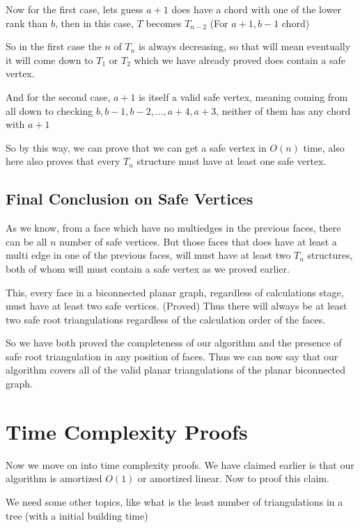 \documentclass[12pt,a4paper]{article}
\begin{document}
Now for the first case, lets guess $a+1$ does have a chord with one of the lower rank than $b$, then in this case, $T$ becomes $T_{n-2}$ (For $a+1, b-1$ chord)

So in the first case the $n$ of $T_n$ is always decreasing, so that will mean eventually it will come down to $T_1$ or $T_2$ which we have already proved does contain a safe vertex. 

And for the second case, $a+1$ is itself a valid safe vertex, meaning coming from all down to checking $b, b-1,b-2,\ldots,a+4,a+3$, neither of them has any chord with $a+1$

So by this way, we can prove that we can get a safe vertex in $O(n)$ time, also here also proves that every $T_n$ structure must have at least one safe vertex.

\subsection{Final Conclusion on Safe Vertices}

As we know, from a face which have no multiedges in the previous faces, there can be all $n$ number of safe vertices. But those faces that does have at least a multi edge in one of the previous faces, will must have at least two $T_n$ structures, both of whom will must contain a safe vertex as we proved earlier.

This, every face in a biconnected planar graph, regardless of calculations stage, must have at least two safe vertices. (Proved) Thus there will always be at least two safe root triangulations regardless of the calculation order of the faces.

So we have both proved the completeness of our algorithm and the presence of safe root triangulation in any position of faces. Thus we can now say that our algorithm covers all of the valid planar triangulations of the planar biconnected graph.

\section{Time Complexity Proofs}

Now we move on into time complexity proofs. We have claimed earlier is that our algorithm is amortized $O(1)$ or amortized linear. Now to proof this claim.

We need some other topics, like what is the least number of triangulations in a tree (with a initial building time)
\end{document}
